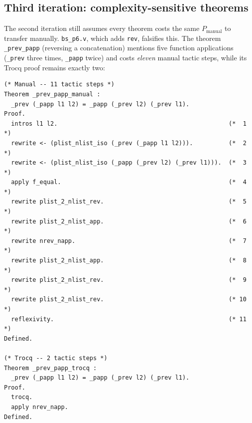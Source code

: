 \documentclass[runningheads]{llncs}
\begin{document}
\subsection{Third iteration: complexity-sensitive theorems}
\label{sec:third}

The second iteration still assumes every theorem costs the same
$P_{\text{manual}}$ to transfer manually. \texttt{bs\_p6.v}, which adds
\texttt{rev}, falsifies this. The theorem \texttt{\_prev\_papp} (reversing a
concatenation) mentions five function applications (\texttt{\_prev} three
times, \texttt{\_papp} twice) and costs \emph{eleven} manual tactic steps,
while its Trocq proof remains exactly two:

\begin{lstlisting}
(* Manual -- 11 tactic steps *)
Theorem _prev_papp_manual :
  _prev (_papp l1 l2) = _papp (_prev l2) (_prev l1).
Proof.
  intros l1 l2.                                                (*  1 *)
  rewrite <- (plist_nlist_iso (_prev (_papp l1 l2))).          (*  2 *)
  rewrite <- (plist_nlist_iso (_papp (_prev l2) (_prev l1))).  (*  3 *)
  apply f_equal.                                               (*  4 *)
  rewrite plist_2_nlist_rev.                                   (*  5 *)
  rewrite plist_2_nlist_app.                                   (*  6 *)
  rewrite nrev_napp.                                           (*  7 *)
  rewrite plist_2_nlist_app.                                   (*  8 *)
  rewrite plist_2_nlist_rev.                                   (*  9 *)
  rewrite plist_2_nlist_rev.                                   (* 10 *)
  reflexivity.                                                 (* 11 *)
Defined.

(* Trocq -- 2 tactic steps *)
Theorem _prev_papp_trocq :
  _prev (_papp l1 l2) = _papp (_prev l2) (_prev l1).
Proof.
  trocq.
  apply nrev_napp.
Defined.
\end{lstlisting}
\end{document}
